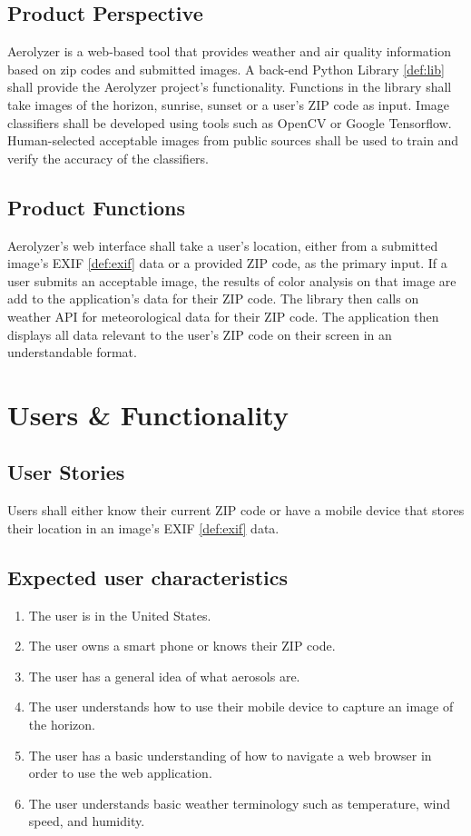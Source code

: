 \documentclass[journal,10pt,draftclsnofoot,onecolumn]{IEEEtran}
\begin{document}
\begin{singlespace}
	\subsection{Product Perspective}
		Aerolyzer is a web-based tool that provides weather and air quality information based on zip codes and submitted images.
		A back-end Python Library \ref{def:lib} shall provide the Aerolyzer project's functionality.
		Functions in the library shall take images of the horizon, sunrise, sunset or a user's ZIP code as input.
		Image classifiers shall be developed using tools such as OpenCV or Google Tensorflow.
		Human-selected acceptable images from public sources shall be used to train and verify the accuracy of the classifiers.

	\subsection{Product Functions}
		Aerolyzer's web interface shall take a user's location, either from a submitted image's EXIF \ref{def:exif} data or a provided ZIP code, as the primary input.
		If a user submits an acceptable image, the results of color analysis on that image are add to the application's data for their ZIP code.
		The library then calls on weather API for meteorological data for their ZIP code.
		The application then displays all data relevant to the user's ZIP code on their screen in an understandable format.

\clearpage

\section{Users \& Functionality}
	
	\subsection{User Stories}
		Users shall either know their current ZIP code or have a mobile device that stores their location in an image's EXIF \ref{def:exif} data.

	\subsection{Expected user characteristics}
		\begin{enumerate}
			\item The user is in the United States.
			\item The user owns a smart phone or knows their ZIP code.
			\item The user has a general idea of what aerosols are.
			\item The user understands how to use their mobile device to capture an image of the horizon.
			\item The user has a basic understanding of how to navigate a web browser in order to use the web application.
			\item The user understands basic weather terminology such as temperature, wind speed, and humidity.
		\end{enumerate}


\end{singlespace}
\end{document}
